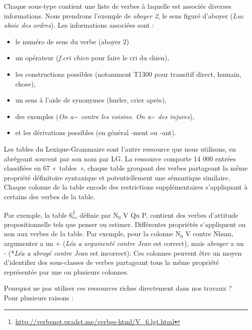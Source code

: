 Chaque sous-type contient une liste de verbes à laquelle est associée diverses
informations. Nous prendrons l'exemple de \textit{aboyer 2}, le sens figuré
d'aboyer (\textit{Luc aboie des ordres}). Les informations associées sont :

\begin{itemize}
    \item le numéro de sens du verbe (aboyer 2)
    \item un opérateur (\textit{f.cri chien} pour faire le cri du chien),
    \item les constructions possibles (notamment T1300 pour transitif direct,
        humain, chose),
    \item un sens à l'aide de synonymes (hurler, crier après),
    \item des exemples (\textit{On a\~~contre les voisins. On a\~~des injures}),
    \item et les dérivations possibles (en général -ment ou -ant).
\end{itemize}

Les tables du Lexique-Grammaire \citep{gross1975methodes,boons1976structure}
sont l'autre ressource que nous utilisons, en abrégeant souvent par son nom par
LG. La ressource comporte 14 000 entrées classifiées en 67 «~tables~», chaque
table groupant des verbes partageant la même propriété définitoire syntaxique
et potentiellement une sémantique similaire. Chaque colonne de la table encode
des restrictions supplémentaires s'appliquant à certains des verbes de la
table.

Par exemple, la table
6\footnote{\url{http://verbenet.pradet.me/verbes-html/V_6.lgt.html}}, définie
par N$_0$ V Qu P, contient des verbes d'attitude propositionnelle tels que
penser ou estimer. Différentes propriétés s'appliquent ou non aux verbes de la
table. Par exemple, pour la colonne N$_0$ V contre Nhum, argumenter a un +
(\textit{Léa a argumenté contre Jean} est correct), mais \textit{abroger} a un
- (*\textit{Léa a abrogé contre Jean} est incorrect). Ces colonnes peuvent être
un moyen d'identifier des sous-classes de verbes partageant tous la même
propriété représentée par une ou plusieurs colonnes.

Pourquoi ne pas utiliser ces ressources riches directement dans nos travaux ?
Pour plusieurs raisons :

